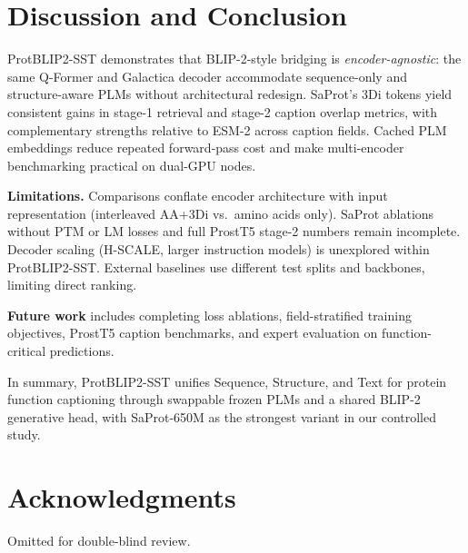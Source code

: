 \documentclass[conference]{IEEEtran}
\begin{document}
\section{Discussion and Conclusion}
\label{sec:discussion}

ProtBLIP2-SST demonstrates that BLIP-2-style bridging is \emph{encoder-agnostic}: the same Q-Former and Galactica decoder accommodate sequence-only and structure-aware PLMs without architectural redesign.
SaProt's 3Di tokens yield consistent gains in stage-1 retrieval and stage-2 caption overlap metrics, with complementary strengths relative to ESM-2 across caption fields.
Cached PLM embeddings reduce repeated forward-pass cost and make multi-encoder benchmarking practical on dual-GPU nodes.

\textbf{Limitations.}
Comparisons conflate encoder architecture with input representation (interleaved AA+3Di vs.\ amino acids only).
SaProt ablations without PTM or LM losses and full ProstT5 stage-2 numbers remain incomplete.
Decoder scaling (H-SCALE, larger instruction models) is unexplored within ProtBLIP2-SST.
External baselines use different test splits and backbones, limiting direct ranking.

\textbf{Future work} includes completing loss ablations, field-stratified training objectives, ProstT5 caption benchmarks, and expert evaluation on function-critical predictions.

In summary, ProtBLIP2-SST unifies Sequence, Structure, and Text for protein function captioning through swappable frozen PLMs and a shared BLIP-2 generative head, with SaProt-650M as the strongest variant in our controlled study.

\section*{Acknowledgments}
Omitted for double-blind review.



\end{document}
